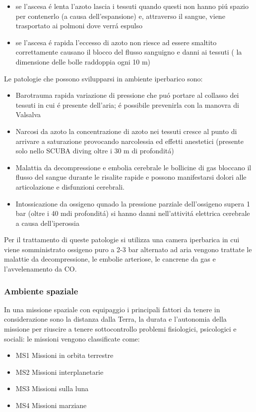 \documentclass[10pt]{article}
\begin{document}
\begin{itemize}
\item se l'ascesa é lenta l'azoto lascia i tessuti quando questi non hanno piú spazio per contenerlo (a causa dell'espansione) e, attraverso il sangue, viene trasportato ai polmoni dove verrá espulso
\item se l'ascesa é rapida l'eccesso di azoto non riesce ad essere smaltito correttamente causano il blocco del flusso sanguigno e danni ai tessuti ( la dimensione delle bolle raddoppia ogni 10 m)
\end{itemize} 
Le patologie che possono svilupparsi in ambiente iperbarico sono:
\begin{itemize}
\item Barotrauma \textrightarrow rapida variazione di pressione che puó portare al collasso dei tessuti in cui é presente dell'aria; é possibile prevenirla con la manovra di Valsalva
\item Narcosi da azoto \textrightarrow la concentrazione di azoto nei tessuti cresce al punto di arrivare a saturazione provocando narcolessia ed effetti anestetici (presente solo nello SCUBA diving oltre i 30 m di profonditá)
\item Malattia da decompressione e embolia cerebrale \textrightarrow le bollicine di gas bloccano il flusso del sangue durante le risalite rapide e possono manifestarsi dolori alle articolazione e disfunzioni cerebrali.
\item Intossicazione da ossigeno \textrightarrow qunado la pressione parziale dell'ossigeno supera 1 bar (oltre i 40 mdi profonditá) si hanno danni nell'attivitá elettrica cerebrale a causa  dell'iperossia
\end{itemize}
Per il trattamento di queste patologie si utilizza una camera iperbarica in cui viene somministrato ossigeno puro a 2-3 bar alternato ad aria \textrightarrow vengono trattate le malattie da decompressione, le embolie arteriose, le cancrene da gas e l'avvelenamento da CO.
\subsubsection{Ambiente spaziale}

In una missione spaziale con equipaggio i principali fattori da tenere in considerazione sono la distanza dalla Terra, la durata e l'autonomia della missione per riuscire a tenere sottocontrollo problemi fisiologici, psicologici e sociali: le missioni vengono classificate come:
\begin{itemize}
\item MS1 Missioni in orbita terrestre
\item MS2 Missioni interplanetarie
\item MS3 Missioni sulla luna
\item MS4 Missioni marziane
\end{itemize}
\end{document}
